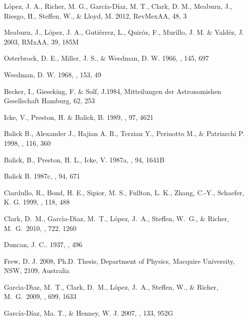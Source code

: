 \documentclass{aa}
\begin{document}
%
\begin{thebibliography}{}


 L\'opez, J. A., Richer, M. G.,
  Garc\'ia-D\'iaz, M. T., Clark, D. M., Meaburn, J., Riesgo, H., Steffen,
  W., \& Lloyd, M. 2012, RevMexAA, 48, 3

 Meaburn, J., L\'opez,
J. A., Guti\'errez, L., Quir\'oz, F., Murillo, J. M. \& Vald\'ez, J.
2003, RMxAA, 39, 185M

 Osterbrock, D. E., Miller,
  J. S., \& Weedman, D. W. 1966, \apj, 145, 697

 Weedman, D. W. 1968, \apj, 153, 49

 Becker, I., Gieseking, F. \& Solf, J.1984, 
Mitteilungen der Astronomishen Gesellschaft Hamburg, 62, 253

 Icke, V., Preston, H. \& Balick, B.
 1989, \aj, 97, 4621



 Balick B., Alexander J.,
  Hajian A. R., Terzian Y., Perinotto M., \& Patriarchi P. 1998,
  \apj, 116, 360

 Balick, B., Preston, H. L.,
  Icke, V. 1987a, \aj, 94, 1641B



 Balick B. 1987c, \aj, 94, 671

 Ciardullo, R., Bond,
  H. E., Sipior, M. S., Fullton, L. K., Zhang, C.-Y., Schaefer,
  K. G. 1999, \aj, 118, 488
  
  Clark, D.~M., 
Garc{\'{\i}}a-D{\'{\i}}az, M.~T., L{\'o}pez, J.~A., Steffen, W.~G., 
\& Richer, M.~G.\ 2010, \apj, 722, 1260 

 Duncan, J. C.. 1937, , 496
  
 Frew, D. J. 2008, Ph.D. Thesis, Department of Physics,
  Macquire University, NSW, 2109, Australia
  
Garc{\'{\i}}a-D{\'{\i}}az, M.~T., Clark, D.~M., L{\'o}pez, J.~A., Steffen, 
W., \& Richer, M.~G.\ 2009, \apj, 699, 1633 

 Garc\'ia-D\'iaz,
  Ma. T., \& Henney, W. J. 2007, \aj, 133, 952G


\end{thebibliography}
\end{document}
